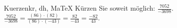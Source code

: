 \begin{MAufgabe}{Kuerzen}{kr, dh, MaTeX}
K\"urzen Sie soweit m\"oglich: $\frac{7052}{-3698}$.\\ 
\ifLsg\MLoesung
\quad $\frac{7052}{-3698}=\frac{(86)\cdot(82)}{(86)\cdot(-43)}=\frac{82}{-43}=\frac{-82}{43}$.\else\relax\fi
 \end{MAufgabe}